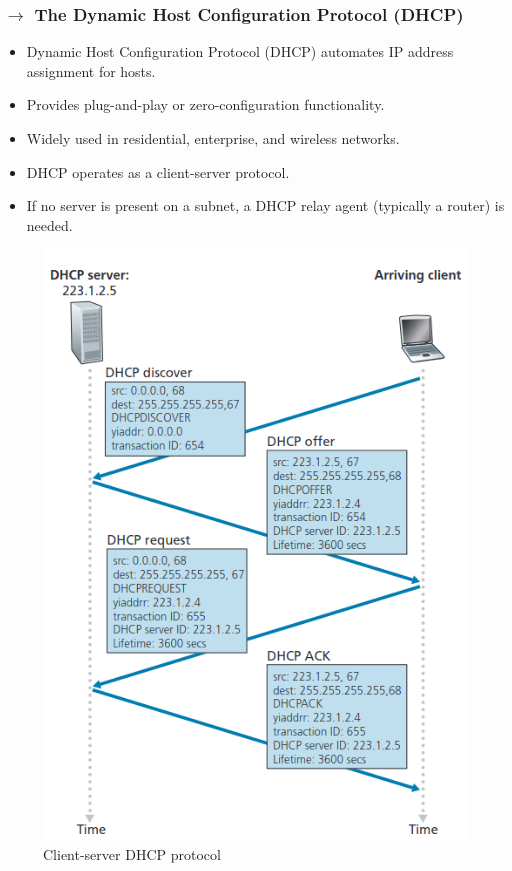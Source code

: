 \subsubsection[4.4.3 The Dynamic Host Configuration Protocol (DHCP)]{$\rightarrow$ The Dynamic Host Configuration Protocol (DHCP)}

\begin{itemize}
    \item Dynamic Host Configuration Protocol (DHCP) automates IP address assignment for hosts.
    \item Provides plug-and-play or zero-configuration functionality.
    \item Widely used in residential, enterprise, and wireless networks.
    \item DHCP operates as a client-server protocol.
    \item If no server is present on a subnet, a DHCP relay agent (typically a router) is needed.
\end{itemize}

\begin{figure}[H]
    \centering
    \includegraphics[width = 0.6\linewidth]{img/4/data-plane/DHCP.png}
    \caption{Client-server DHCP protocol}
    \label{fig:DHCP}
    \end{figure}

